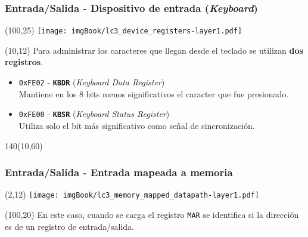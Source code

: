\documentclass[aspectratio=169]{beamer}
\begin{document}
\begin{frame}[t,fragile]
    \frametitle{Entrada/Salida - Dispositivo de entrada (\emph{Keyboard})}
    \begin{textblock}{65}(100,25) \texttt{[image: imgBook/lc3\_device\_registers-layer1.pdf]} \end{textblock}
    \begin{textblock}{75}(10,12)
    Para administrar los caracteres que llegan desde el teclado se utilizan \textbf{dos registros}.\\
    \bigskip
    \begin{itemize}
     \item<2-> \textcolor{naranjauca}{\texttt{0xFE02}} - \textbf{\texttt{KBDR}} (\emph{Keyboard Data Register})\\
     Mantiene en los 8 bits menos significativos el caracter que fue presionado.
     \item<3-> \textcolor{naranjauca}{\texttt{0xFE00}} - \textbf{\texttt{KBSR}} (\emph{Keyboard Status Register})\\
     Utiliza solo el bit más significativo como señal de sincronización.
    \end{itemize}
    \end{textblock}
    \begin{textblock}{140}(10,60)
    \bigskip
    \end{textblock}
\end{frame}

\begin{frame}[t,fragile]
    \frametitle{Entrada/Salida - Entrada mapeada a memoria}
    \begin{textblock}{65}(2,12) \texttt{[image: imgBook/lc3\_memory\_mapped\_datapath-layer1.pdf]} \end{textblock}
    \begin{textblock}{50}(100,20)
    En este caso, cuando se carga el registro \texttt{MAR} \textcolor{verdeuca}{se identifica si la dirección es de un registro de entrada/salida.}\\
    \bigskip
    \end{textblock}
\end{frame}
\end{document}
